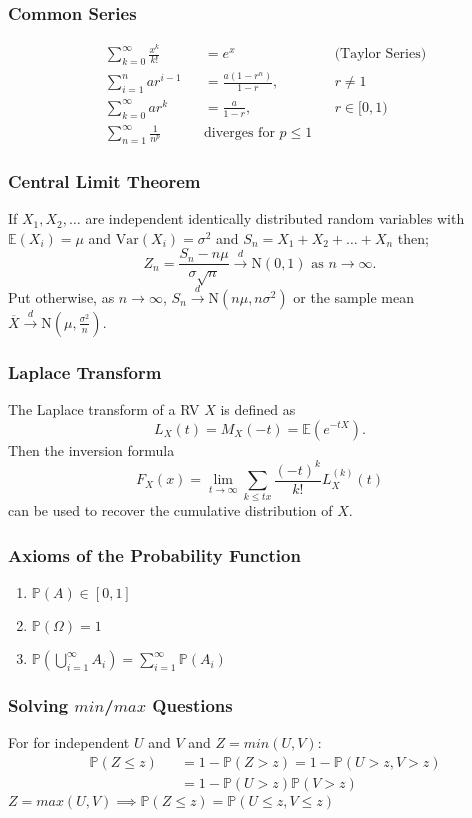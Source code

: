 \documentclass[titlepage,twocolumn]{article}
\begin{document}
\subsubsection*{Common Series}
\begin{align*}
    &\sum_{k=0}^{\infty}\frac{x^k}{k!} &&= e^x &&\mbox{(Taylor Series)} \\
    &\sum_{i=1}^{n} a r^{i-1} &&= \frac{a(1-r^n)}{1-r}, && r \neq 1 \\
    &\sum_{k=0}^{\infty} a r^k &&= \frac{a}{1-r}, && r \in [0,1) \\
    &\sum_{n=1}^{\infty} \frac{1}{n^p} && \mbox{diverges for } p \leq 1
\end{align*}
\subsubsection*{Central Limit Theorem}
If $X_1, X_2,\dots$ are independent identically distributed random variables with $\mathbb{E}(X_i)=\mu$ and $\mbox{Var}(X_i)=\sigma^2$ and $S_n = X_1 + X_2 + \dots + X_n$ then;
$$Z_n = \frac{S_n - n\mu}{\sigma \sqrt{n}} \stackrel{d}{\rightarrow} \mbox{N}(0,1) \mbox{ as } n\rightarrow \infty.$$ Put otherwise, as $n \rightarrow \infty$, $S_n \stackrel{d}{\rightarrow} \mbox{N}(n\mu, n\sigma^2)$ or the sample mean $\overline{X} \stackrel{d}{\rightarrow} \mbox{N}(\mu, \frac{\sigma^2}{n})$.
\subsubsection*{Laplace Transform}
The Laplace transform of a RV $X$ is defined as $$L_X(t)=M_X(-t)=\mathbb{E}(e^{-tX}).$$ Then the inversion formula $$F_X(x) = \lim_{t\rightarrow \infty} \sum_{k\leq tx} \frac{(-t)^k}{k!}L_X^{(k)}(t)$$ can be used to recover the cumulative distribution of $X$.
\subsubsection*{Axioms of the Probability Function}
\begin{enumerate}
    \item $\mathbb{P}(A) \in [0,1]$
    \item $\mathbb{P}(\Omega) = 1$
    \item $\mathbb{P}(\bigcup_{i=1}^{\infty} A_i) = \sum_{i=1}^{\infty} \mathbb{P}(A_i)$
\end{enumerate}
\subsubsection*{Solving $min$/$max$ Questions}
For for independent $U$ and $V$ and $Z = min(U, V)$:
\begin{align*}
    &\mathbb{P}(Z \leq z) &&= 1 - \mathbb{P}(Z > z) = 1 - \mathbb{P}(U > z, V > z) \\
    &   &&= 1 - \mathbb{P}(U > z)\mathbb{P}(V > z)
\end{align*}
$Z = max(U, V) \implies \mathbb{P}(Z \leq z) = \mathbb{P}(U \leq z, V \leq z)$
\end{document}

